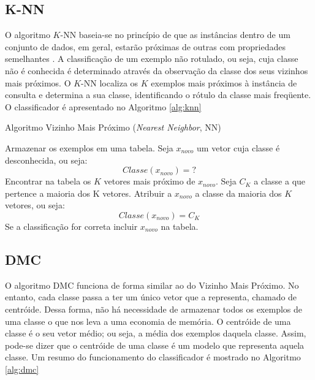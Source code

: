 \documentclass{article}
\begin{document}
\subsection{K-NN}
O algoritmo $K$-NN baseia-se no princípio de que as instâncias dentro de um conjunto de dados, em geral, estarão próximas de outras com propriedades semelhantes \cite{Cover:2006}. A classificação de um exemplo não rotulado, ou seja, cuja classe não é conhecida é determinado através da observação da classe dos seus vizinhos mais próximos. O $K$-NN localiza os $K$ exemplos mais próximos à instância de consulta e determina a sua classe, identificando o rótulo da classe mais freqüente. O classificador é apresentado no Algoritmo \ref{alg:knn}

\begin{algorithm}[!h]
\caption{Algoritmo Vizinho Mais Próximo (\textit{Nearest Neighbor}, NN)}\label{alg:knn}
\begin{algorithmic}[1]
\STATE Armazenar os exemplos em uma tabela.%
\STATE Seja $x_{novo}$ um vetor cuja classe é desconhecida, ou seja:
\begin{equation*}
Classe(x_{novo}) = ?
\end{equation*}
%
\STATE Encontrar na tabela os $K$ vetores mais próximo de $x_{novo}$.%
\STATE Seja $C_K$ a classe a que pertence a maioria dos K vetores.%
\STATE Atribuir a $x_{novo}$ a classe da maioria dos $K$ vetores, ou seja:
\begin{equation*}
Classe(x_{novo}) = C_K
\end{equation*}
%
\STATE Se a classificação for correta incluir $x_{novo}$ na tabela.
\end{algorithmic}
\end{algorithm}


\subsection{DMC}
O algoritmo DMC funciona de forma similar ao do Vizinho Mais Próximo. No entanto, cada classe passa a ter um único vetor que a representa, chamado de centróide. Dessa forma, não há necessidade de armazenar todos os exemplos de uma classe o que nos leva a uma economia de memória. O centróide de uma classe é o seu vetor médio; ou seja, a média dos exemplos daquela classe. Assim, pode-se dizer que o centróide de uma classe é um modelo que representa aquela classe. Um resumo do funcionamento do classificador é mostrado no Algoritmo \ref{alg:dmc}
\end{document}
